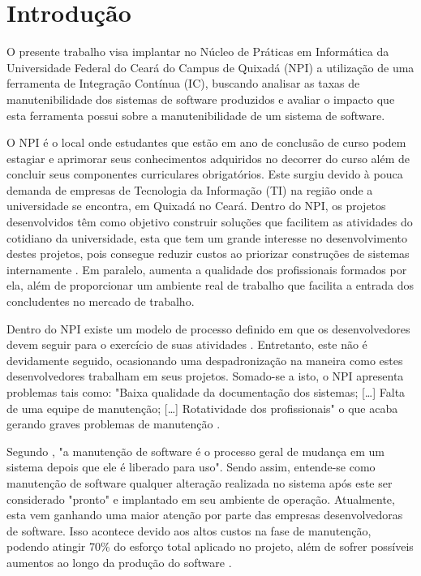 \chapter{Introdução}

O presente trabalho visa implantar no Núcleo de Práticas em Informática da Universidade Federal do Ceará do Campus de Quixadá (NPI) a utilização de uma ferramenta de Integração Contínua (IC), buscando analisar as taxas de manutenibilidade dos sistemas de software produzidos e avaliar o impacto que esta ferramenta possui sobre a manutenibilidade de um sistema de software.

O NPI é o local onde estudantes que estão em ano de conclusão de curso podem estagiar e aprimorar seus conhecimentos adquiridos no decorrer do curso além de concluir seus componentes curriculares obrigatórios. Este surgiu devido à pouca demanda de empresas de Tecnologia da Informação (TI) na região onde a universidade se encontra, em Quixadá no Ceará. Dentro do NPI, os projetos desenvolvidos têm como objetivo construir soluções que facilitem as atividades do cotidiano da universidade, esta que tem um grande interesse no desenvolvimento destes projetos, pois consegue reduzir custos ao priorizar construções de sistemas internamente \cite{npi2013}. Em paralelo, aumenta a qualidade dos profissionais formados por ela, além de proporcionar um ambiente real de trabalho que facilita a entrada dos concludentes no mercado de trabalho.

Dentro do NPI existe um modelo de processo definido em que os desenvolvedores devem seguir para o exercício de suas atividades \cite{npi2013}. Entretanto, este não é devidamente seguido, ocasionando uma despadronização na maneira como estes  desenvolvedores trabalham em seus projetos. Somado-se a isto, o NPI apresenta problemas tais como: "Baixa qualidade da documentação dos sistemas; [\ldots] Falta de uma equipe de manutenção; [\ldots] Rotatividade dos profissionais" o que acaba gerando graves problemas de manutenção \cite[p.~4]{paduelli2006}.


Segundo , "a manutenção de software é o processo geral de mudança em um sistema depois que ele é liberado para uso". Sendo assim, entende-se como manutenção de software  qualquer alteração realizada no sistema após este ser considerado "pronto" e implantado em seu ambiente de operação. Atualmente, esta vem ganhando uma maior atenção por parte das empresas desenvolvedoras de software. Isso acontece devido aos altos custos na fase de manutenção, podendo atingir 70\% do esforço total aplicado no projeto, além de sofrer possíveis aumentos ao longo da produção do software \cite{pressman2010}.

